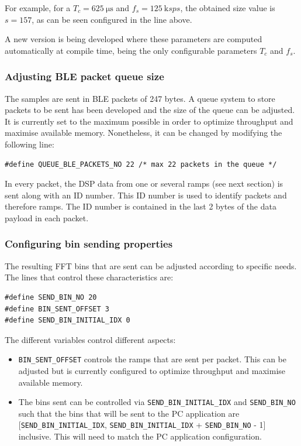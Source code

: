 For example, for a $T_c = \SI{625}{\micro\second}$ and $f_s = \SI{125}{\kilo sps}$, the obtained size value is $s = 157$, as can be seen configured in the line above.

A new version is being developed where these parameters are computed automatically at compile time, being the only configurable parameters $T_c$ and $f_s$.


\subsubsection{Adjusting BLE packet queue size}

The samples are sent in BLE packets of 247 bytes. A queue system to store packets to be sent has been developed and the size of the queue can be adjusted. It is currently set to the maximum possible in order to optimize throughput and maximise available memory. Nonetheless, it can be changed by modifying the following line:
\begin{verbatim}
#define QUEUE_BLE_PACKETS_NO 22 /* max 22 packets in the queue */
\end{verbatim}

In every packet, the DSP data from one or several ramps (see next section) is sent along with an ID number. This ID number is used to identify packets and therefore ramps. The ID number is contained in the last 2 bytes of the data payload in each packet.

\subsubsection{Configuring bin sending properties}

The resulting FFT bins that are sent can be adjusted according to specific needs. The lines that control these characteristics are:
\begin{verbatim}
#define SEND_BIN_NO 20
#define BIN_SENT_OFFSET 3
#define SEND_BIN_INITIAL_IDX 0
\end{verbatim}
The different variables control different aspects:
\begin{itemize}
	\item \texttt{BIN\_SENT\_OFFSET} controls the ramps that are sent per packet. This can be adjusted but is currently configured to optimize throughput and maximise available memory.
	\item The bins sent can be controlled via \texttt{SEND\_BIN\_INITIAL\_IDX} and \texttt{SEND\_BIN\_NO} such that the bins that will be sent to the PC application are [\texttt{SEND\_BIN\_INITIAL\_IDX}, \texttt{SEND\_BIN\_INITIAL\_IDX} + \texttt{SEND\_BIN\_NO} - 1] inclusive. This will need to match the PC application configuration.
\end{itemize}

